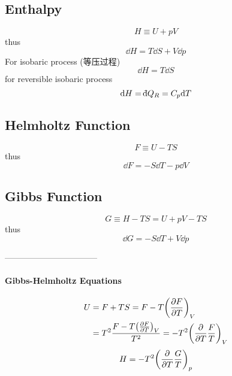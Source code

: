 \documentclass[UTF8]{ctexart} %
\newcommand{\dbar}{{\mathchar'26\mkern-11mu\mathrm{d}}}
\numberwithin{equation}{subsection}
\begin{document}
\subsection{Enthalpy}
\begin{equation}\label{key}
H \equiv U + pV
\end{equation}
thus
\begin{equation}\label{key}
\dd H = T\dd S + V\dd p
\end{equation}
For isobaric process (等压过程)
\begin{equation}\label{key}
\dd H = T\dd S
\end{equation}
for reversible isobaric process
\begin{equation}\label{key}
\dd H = \dbar Q_R = C_p\dd T
\end{equation}

\subsection{Helmholtz Function}
\begin{equation}\label{key}
F \equiv U - TS
\end{equation}
thus
\begin{equation}\label{key}
\dd F = -S\dd T -p\dd V
\end{equation}

\subsection{Gibbs Function}
\begin{equation}\label{key}
G \equiv H - TS = U + pV - TS
\end{equation}
thus 
\begin{equation}\label{key}
\dd G = -S\dd T + V\dd p
\end{equation}

---------------------------------~\\
\paragraph{Gibbs-Helmholtz Equations}
\begin{equation}\label{key}
\begin{aligned}
U &= F + TS = F - T\qty(\pdv{F}{T})_V\\
 &= T^2 \dfrac{F - T\qty(\pdv{F}{T})_V}{T^2} = -T^2\qty(\pdv{T}\dfrac{F}{T})_V
\end{aligned}
\end{equation}
\begin{equation}\label{key}
H = -T^2\qty(\pdv{T}\dfrac{G}{T})_p
\end{equation}
\end{document}
